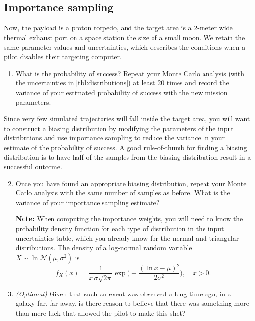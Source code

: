\documentclass[11pt]{article}
\begin{document}
\subsection{Importance sampling}
Now, the payload is a proton torpedo, and the target area is a $2$-meter wide thermal exhaust port on a space station the size of a small moon. We retain the same parameter values and uncertainties, which describes the conditions when a pilot disables their targeting computer.
\begin{enumerate}
  \item  What is the probability of success? Repeat your Monte Carlo analysis (with the uncertainties in \cref{tbl:distributions}) at least 20 times and record the variance of your estimated probability of success with the new mission parameters.
\end{enumerate}
Since very few simulated trajectories will fall inside the target area, you will want to construct a biasing distribution by modifying the parameters of the input distributions and use importance sampling to reduce the variance in your estimate of the probability of success. A good rule-of-thumb for finding a biasing distribution is to have half of the samples from the biasing distribution result in a successful outcome.
\begin{enumerate}
\setcounter{enumi}{1}
\item Once you have found an appropriate biasing distribution, repeat your Monte Carlo analysis with the same number of samples as before. What is the variance of your importance sampling estimate?

\textbf{Note:} When computing the importance weights, you will need to know the probability density function for each type of distribution in the input uncertainties table, which you already know for the normal and triangular distributions. The density of a log-normal random variable $X\sim\ln\mathcal{N}(\mu, \sigma^2)$ is
\[ f_X(x)=\frac{1}{x\,\sigma\sqrt{2\pi}}\exp\biggl(-\frac{(\ln x-\mu)^2}{2\sigma^2}\biggr),\quad x>0.\]
\item\emph{(Optional)} Given that such an event was observed a long time ago, in a galaxy far, far away, is there reason to believe that there was something more than mere luck that allowed the pilot to make this shot?
\end{enumerate}

\end{document}
